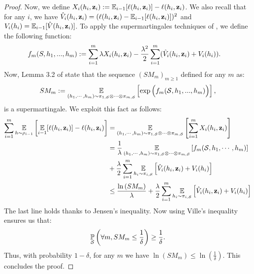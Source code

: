 \documentclass{article}
\begin{document}
\begin{proof}
Now, we define $X_i(h_i,\mathbf{z}_i):= \operatorname*{\mathbb{E}}_{i-1}[\ell(h_i,\mathbf{z}_i)]- \ell(h_i, \mathbf{z}_i)$. We also recall that for any $i$, we have $\hat{V}_i(h_i,\mathbf{z}_i)= (\ell(h_i,\mathbf{z}_i)-\operatorname*{\mathbb{E}}_{i-1}[\ell(h_i,\mathbf{z}_i)])^2$ and $V_i(h_i)= \operatorname*{\mathbb{E}}_{i-1}[\hat{V}(h_i,\mathbf{z}_i)]$.
To apply the supermartingales techniques of \cite{haddouche2023pac}, we define the following function:
\begin{align*}
   f_m(S,h_1,...,h_m) & := \sum_{i=1}^m \lambda X_i(h_i,\mathbf{z}_i)  - \frac{\lambda^2}{2}\sum_{i=1}^m(\hat{V}_i(h_i,\mathbf{z}_i) + V_i(h_i)).
   \end{align*}
    Now, Lemma 3.2 of \cite{haddouche2023pac} state that the sequence $(SM_m)_{m\geq 1}$ defined for any $m$ as:
    \begin{align*}
     SM_m := \operatorname*{\mathbb{E}}_{(h_1,\cdots,h_m) \sim \pi_{1,\mathcal{S}} \otimes \cdots \otimes \pi_{m,\mathcal{S}}} \left[ \exp \Big( f_m(\mathcal{S},h_1,...,h_m) \Big)  \right],
     \end{align*}
    is a supermartingale. 
    We exploit this fact as follows: 
    \begin{align*}
        \sum_{i=1}^{m}\operatorname*{\mathbb{E}}_{h\sim\rho_{i-1}}\left[\operatorname*{\mathbb{E}}_{i-1}[\ell(h_i,\mathbf{z}_i)]-\ell(h_i, \mathbf{z}_i)\right] &= \operatorname*{\mathbb{E}}_{(h_1,\cdots,h_m) \sim \pi_{1,\mathcal{S}} \otimes \cdots \otimes \pi_{m,\mathcal{S}}} \left[\sum_{i=1}^m X_i(h_i,\mathbf{z}_i)\right] \\
        & = \frac{1}{\lambda}\operatorname*{\mathbb{E}}_{(h_1,\cdots,h_m) \sim \pi_{1,\mathcal{S}} \otimes \cdots \otimes \pi_{m,\mathcal{S}}} \left[ f_m (\mathcal{S},h_1,\cdots,h_m)\right] \\
        & + \frac{\lambda}{2} \sum_{i=1}^m \operatorname*{\mathbb{E}}_{h_i\sim \pi_{i,\mathcal{S}}}\left[ \hat{V}_i(h_i,\mathbf{z}_i) + V_i(h_i) \right] \\
        & \leq \frac{\ln\left( SM_m \right)}{\lambda} + \frac{\lambda}{2} \sum_{i=1}^m \operatorname*{\mathbb{E}}_{h_i\sim \pi_{i,\mathcal{S}}}\left[ \hat{V}_i(h_i,\mathbf{z}_i) + V_i(h_i) \right]
    \end{align*}
    The last line holds thanks to Jensen's inequality.
    Now using Ville's inequality ensures us that:
    \begin{align*}
    \operatorname*{\mathbb{P}}_{\mathcal{S}}\left( \forall m, SM_m \leq \frac{1}{\delta} \right) \geq \frac{1}{\delta}.
    \end{align*}
    Thus, with probability $1-\delta$, for any $m$ we have $\ln\left( SM_m \right) \leq \ln\left( \frac{1}{\delta} \right)$.
    This concludes the proof.
\end{proof}
\end{document}
